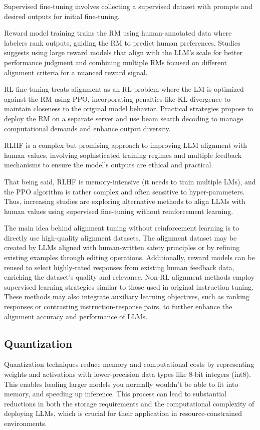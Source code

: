 Supervised fine-tuning involves collecting a supervised dataset with prompts and desired outputs for initial fine-tuning.

Reward model training trains the RM using human-annotated data where labelers rank outputs, guiding the RM to predict human preferences.
Studies suggests using large reward models that align with the LLM’s scale for better performance judgment and combining multiple RMs focused on different alignment criteria for a nuanced reward signal.

RL fine-tuning treats alignment as an RL problem where the LM is optimized against the RM using PPO, incorporating penalties like KL divergence to maintain closeness to the original model behavior.
Practical strategies propose to deploy the RM on a separate server and use beam search decoding to manage computational demands and enhance output diversity.

RLHF is a complex but promising approach to improving LLM alignment with human values, involving sophisticated training regimes and multiple feedback mechanisms to ensure the model's outputs are ethical and practical.

That being said, RLHF is memory-intensive (it needs to train multiple LMs), and the PPO algorithm is rather complex and often sensitive to hyper-parameters.
Thus, increasing studies are exploring alternative methods to align LLMs with human values using supervised fine-tuning without reinforcement learning.

The main idea behind alignment tuning without reinforcement learning is to directly use high-quality alignment datasets.
The alignment dataset may be created by LLMs aligned with human-written safety principles or by refining existing examples through editing operations.
Additionally, reward models can be reused to select highly-rated responses from existing human feedback data, enriching the dataset's quality and relevance.
Non-RL alignment methods employ supervised learning strategies similar to those used in original instruction tuning.
These methods may also integrate auxiliary learning objectives, such as ranking responses or contrasting instruction-response pairs, to further enhance the alignment accuracy and performance of LLMs.

\subsection{Quantization}
\label{subsec:quantization}

Quantization techniques reduce memory and computational costs by representing weights and activations with lower-precision data types like 8-bit integers (int8).
This enables loading larger models you normally wouldn’t be able to fit into memory, and speeding up inference.
This process can lead to substantial reductions in both the storage requirements and the computational complexity of deploying LLMs, which is crucial for their application in resource-constrained environments.

